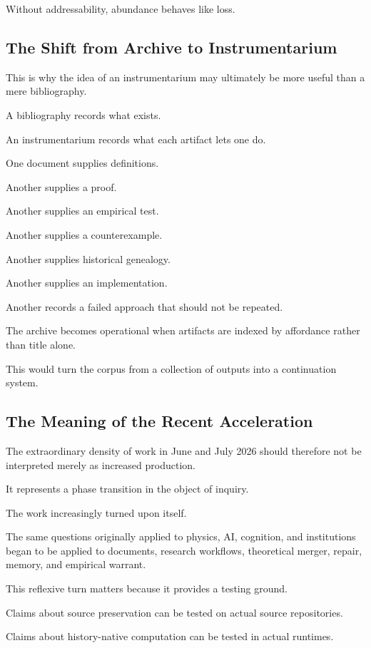 \documentclass[11pt]{article}
\theoremstyle{remark}
\begin{document}
Without addressability, abundance behaves like loss.

\subsection{The Shift from Archive to Instrumentarium}

This is why the idea of an instrumentarium may ultimately be more useful than a
mere bibliography.

A bibliography records what exists.

An instrumentarium records what each artifact lets one do.

One document supplies definitions.

Another supplies a proof.

Another supplies an empirical test.

Another supplies a counterexample.

Another supplies historical genealogy.

Another supplies an implementation.

Another records a failed approach that should not be repeated.

The archive becomes operational when artifacts are indexed by affordance rather
than title alone.

This would turn the corpus from a collection of outputs into a continuation
system.

\subsection{The Meaning of the Recent Acceleration}

The extraordinary density of work in June and July 2026 should therefore not be
interpreted merely as increased production.

It represents a phase transition in the object of inquiry.

The work increasingly turned upon itself.

The same questions originally applied to physics, AI, cognition, and
institutions began to be applied to documents, research workflows, theoretical
merger, repair, memory, and empirical warrant.

This reflexive turn matters because it provides a testing ground.

Claims about source preservation can be tested on actual source repositories.

Claims about history-native computation can be tested in actual runtimes.
\end{document}
